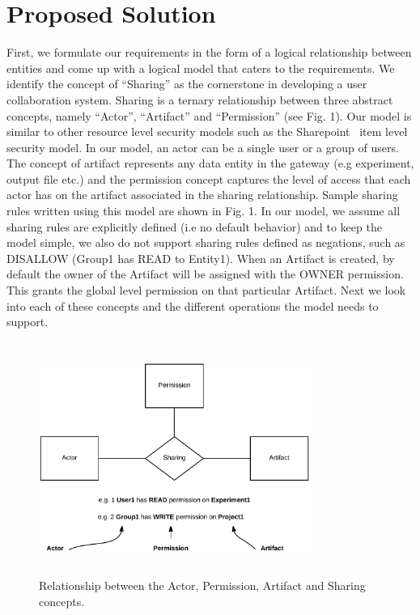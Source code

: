 \documentclass[sigconf]{acmart}
\begin{document}
\section{Proposed Solution}
First, we formulate our requirements in the form of a logical relationship between entities and come up with a logical model that caters to the requirements. We identify the concept of “Sharing” as the cornerstone in developing a user collaboration system. Sharing is a ternary relationship between three abstract concepts, namely ``Actor'', ``Artifact'' and ``Permission'' (see Fig. 1). Our model is similar to other resource level security models such as the Sharepoint~\cite{sharepoint} item level security model. In our model, an actor can be a single user or a group of users. The concept of artifact represents any data entity in the gateway (e.g experiment, output file etc.) and the permission concept captures the level of access that each actor has on the artifact associated in the sharing relationship. Sample sharing rules written using this model are shown in Fig. 1. In our model, we assume all sharing rules are explicitly defined (i.e no default behavior) and to keep the model simple, we also do not support sharing rules defined as negations, such as DISALLOW (Group1 has READ to Entity1). When an Artifact is created, by default the owner of the Artifact will be assigned with the OWNER permission. This grants the global level permission on that particular Artifact. Next we look into each of these concepts and the different operations the model needs to support.

\begin{figure}\label{image:permission-model}
\includegraphics[height=3in, width=3.5in]{figures/sharing-concepts.pdf}
\caption{Relationship between the Actor, Permission, Artifact and Sharing concepts.}
\end{figure}
\end{document}
